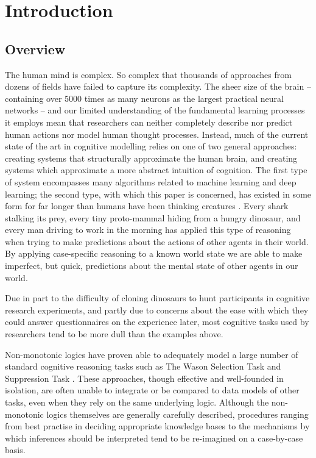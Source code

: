 \chapter{Introduction} \label{chp:intro}
\section{Overview} \label{sec:overview}
The human mind is complex. So complex that thousands of approaches from dozens of fields have failed to capture its complexity. The sheer size of the brain -- containing  over 5000 times as many neurons as the largest practical neural networks \citep{mocanu2018scalable} -- and our limited understanding of the fundamental learning processes it employs mean that researchers can neither completely describe nor predict human actions nor model human thought processes. Instead, much of the current state of the art in cognitive modelling relies on one of two general approaches: creating systems that structurally approximate the human brain, and creating systems which approximate a more abstract intuition of cognition. The first type of system encompasses many algorithms related to machine learning and deep learning; the second type, with which this paper is concerned, has existed in some form for far longer than humans have been thinking creatures \citep{smirnova2015crows}. Every shark stalking its prey, every tiny proto-mammal hiding from a hungry dinosaur, and every man driving to work in the morning has applied this type of reasoning when trying to make predictions about the actions of other agents in their world. By applying case-specific reasoning to a known world state we are able to make imperfect, but quick, predictions about the mental state of other agents in our world.

Due in part to the difficulty of cloning dinosaurs to hunt participants in cognitive research experiments, and partly due to concerns about the ease with which they could answer questionnaires on the experience later, most cognitive tasks used by researchers tend to be more dull than the examples above.

Non-monotonic logics have proven able to adequately model a large number of standard cognitive reasoning tasks such as The Wason Selection Task \citep{wason1968reasoning} and Suppression Task \citep{byrne1989suppressing}. These approaches, though effective and well-founded in isolation, are often unable to integrate or be compared to data models of other tasks, even when they rely on the same underlying logic. Although the non-monotonic logics themselves are generally carefully described, procedures ranging from best practise in deciding appropriate knowledge bases to the mechanisms by which inferences should be interpreted tend to be re-imagined on a case-by-case basis.

